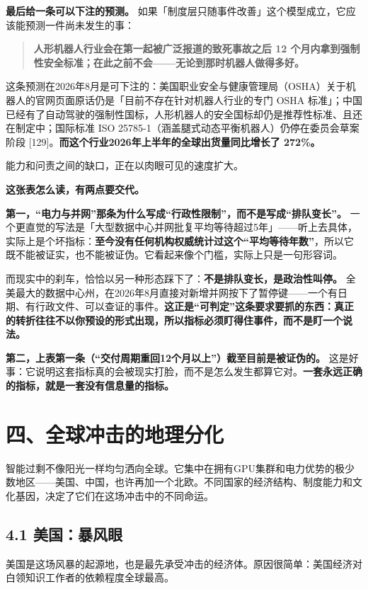 \documentclass[11pt,a4paper]{ctexart}
\begin{document}
\textbf{最后给一条可以下注的预测。} 如果「制度层只随事件改善」这个模型成立，它应该能预测一件尚未发生的事：

\begin{quote}
\textbf{人形机器人行业会在第一起被广泛报道的致死事故之后 12 个月内拿到强制性安全标准；在此之前不会——无论到那时机器人做得多好。}
\end{quote}

这条预测在2026年8月是可下注的：美国职业安全与健康管理局（OSHA）关于机器人的官网页面原话仍是「目前不存在针对机器人行业的专门 OSHA 标准」；中国已经有了自动驾驶的强制性国标，人形机器人的安全国标却仍是推荐性标准、且还在制定中；国际标准 ISO 25785-1（涵盖腿式动态平衡机器人）仍停在委员会草案阶段 [129]。\textbf{而这个行业2026年上半年的全球出货量同比增长了 272\%。}

能力和问责之间的缺口，正在以肉眼可见的速度扩大。

\textbf{这张表怎么读，有两点要交代。}

\textbf{第一，“电力与并网”那条为什么写成“行政性限制”，而不是写成“排队变长”。} 一个更直觉的写法是「大型数据中心并网批复平均等待超过5年」——听上去具体，实际上是个坏指标：\textbf{至今没有任何机构权威统计过这个“平均等待年数”}，所以它既不能被证实，也不能被证伪。它看起来像个门槛，实际上只是一句形容词。

而现实中的刹车，恰恰以另一种形态踩下了：\textbf{不是排队变长，是政治性叫停。} 全美最大的数据中心州，在2026年8月直接对新增并网按下了暂停键——一个有日期、有行政文件、可以查证的事件。\textbf{这正是“可判定”这条要求要抓的东西：真正的转折往往不以你预设的形式出现，所以指标必须盯得住事件，而不是盯一个说法。}

\textbf{第二，上表第一条（“交付周期重回12个月以上”）截至目前是被证伪的。} 这是好事：它说明这套指标真的会被现实打脸，而不是怎么发生都算它对。\textbf{一套永远正确的指标，就是一套没有信息量的指标。}

\section{四、全球冲击的地理分化}

智能过剩不像阳光一样均匀洒向全球。它集中在拥有GPU集群和电力优势的极少数地区——美国、中国，也许再加一个北欧。不同国家的经济结构、制度能力和文化基因，决定了它们在这场冲击中的不同命运。

\subsection{4.1 美国：暴风眼}

美国是这场风暴的起源地，也是最先承受冲击的经济体。原因很简单：美国经济对白领知识工作者的依赖程度全球最高。
\end{document}
